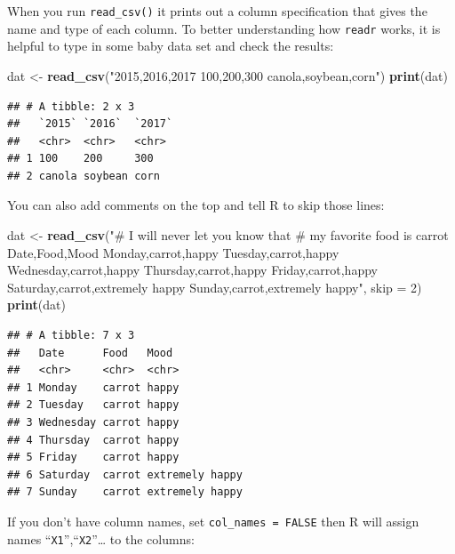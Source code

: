 \documentclass[12pt,]{krantz}
\makeatletter
\newenvironment{Shaded}{\begin{snugshade}}{\end{snugshade}}
\newcommand{\DataTypeTok}[1]{\textcolor[rgb]{0.27,0.27,0.27}{#1}}
\newcommand{\DecValTok}[1]{\textcolor[rgb]{0.06,0.06,0.06}{#1}}
\newcommand{\KeywordTok}[1]{\textcolor[rgb]{0.27,0.27,0.27}{\textbf{#1}}}
\newcommand{\NormalTok}[1]{#1}
\newcommand{\StringTok}[1]{\textcolor[rgb]{0.5,0.5,0.5}{#1}}
\newenvironment{kframe}{%
\medskip{}
\setlength{\fboxsep}{.8em}
 \def\at@end@of@kframe{}%
 \ifinner\ifhmode%
  \def\at@end@of@kframe{\end{minipage}}%
  \begin{minipage}{\columnwidth}%
 \fi\fi%
 \def\FrameCommand##1{\hskip\@totalleftmargin \hskip-\fboxsep
 \colorbox{shadecolor}{##1}\hskip-\fboxsep
     \hskip-\linewidth \hskip-\@totalleftmargin \hskip\columnwidth}%
 \MakeFramed {\advance\hsize-\width
   \@totalleftmargin\z@ \linewidth\hsize
   \@setminipage}}%
 {\par\unskip\endMakeFramed%
 \at@end@of@kframe}
\renewenvironment{Shaded}{\begin{kframe}}{\end{kframe}}
\makeatother
\begin{document}
When you run \texttt{read\_csv()} it prints out a column specification that gives the name and type of each column. To better understanding how \texttt{readr} works, it is helpful to type in some baby data set and check the results:

\begin{Shaded}
\begin{Highlighting}[]
\NormalTok{dat <-}\StringTok{ }\KeywordTok{read_csv}\NormalTok{(}\StringTok{"2015,2016,2017}
\StringTok{100,200,300}
\StringTok{canola,soybean,corn"}\NormalTok{)}
\KeywordTok{print}\NormalTok{(dat)}
\end{Highlighting}
\end{Shaded}

\begin{verbatim}
## # A tibble: 2 x 3
##   `2015` `2016`  `2017`
##   <chr>  <chr>   <chr> 
## 1 100    200     300   
## 2 canola soybean corn
\end{verbatim}

You can also add comments on the top and tell R to skip those lines:

\begin{Shaded}
\begin{Highlighting}[]
\NormalTok{dat <-}\StringTok{ }\KeywordTok{read_csv}\NormalTok{(}\StringTok{"# I will never let you know that}
\StringTok{          # my favorite food is carrot}
\StringTok{          Date,Food,Mood}
\StringTok{          Monday,carrot,happy}
\StringTok{          Tuesday,carrot,happy}
\StringTok{          Wednesday,carrot,happy}
\StringTok{          Thursday,carrot,happy}
\StringTok{          Friday,carrot,happy}
\StringTok{          Saturday,carrot,extremely happy}
\StringTok{          Sunday,carrot,extremely happy"}\NormalTok{, }
          \DataTypeTok{skip =} \DecValTok{2}\NormalTok{)}
\KeywordTok{print}\NormalTok{(dat)}
\end{Highlighting}
\end{Shaded}

\begin{verbatim}
## # A tibble: 7 x 3
##   Date      Food   Mood           
##   <chr>     <chr>  <chr>          
## 1 Monday    carrot happy          
## 2 Tuesday   carrot happy          
## 3 Wednesday carrot happy          
## 4 Thursday  carrot happy          
## 5 Friday    carrot happy          
## 6 Saturday  carrot extremely happy
## 7 Sunday    carrot extremely happy
\end{verbatim}

If you don't have column names, set \texttt{col\_names\ =\ FALSE} then R will assign names ``\texttt{X1}'',``\texttt{X2}''\ldots{} to the columns:
\end{document}

